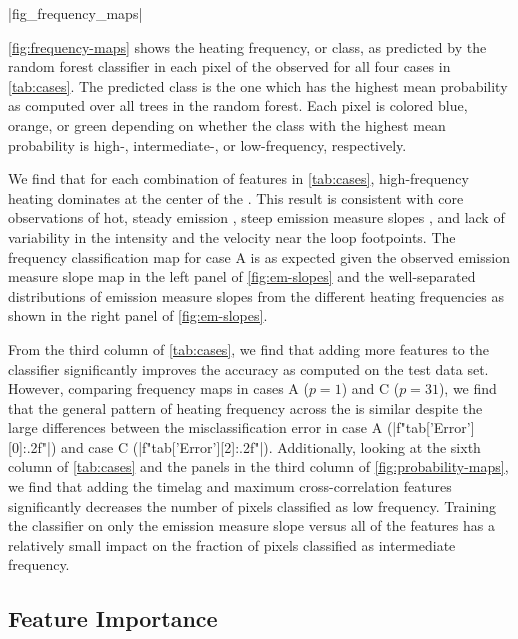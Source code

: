 \py[manager_ml]|fig_frequency_maps|

\autoref{fig:frequency-maps} shows the heating frequency, or class, as predicted by the random forest classifier in each pixel of the observed \AR{} for all four cases in \autoref{tab:cases}. The predicted class is the one which has the highest mean probability as computed over all trees in the random forest. Each pixel is colored blue, orange, or green depending on whether the class with the highest mean probability is high-, intermediate-, or low-frequency, respectively.

We find that for each combination of features in \autoref{tab:cases}, high-frequency heating dominates at the center of the \AR{}. This result is consistent with \AR{} core observations of hot, steady emission \citep{warren_evidence_2010,warren_constraints_2011}, steep emission measure slopes \citep[e.g.][]{winebarger_using_2011,del_zanna_evolution_2015}, and lack of variability in the intensity \citep[e.g.][]{antiochos_constraints_2003} and the velocity \citep{brooks_flows_2009} near the loop footpoints. The frequency classification map for case A is as expected given the observed emission measure slope map in the left panel of \autoref{fig:em-slopes} and the well-separated distributions of emission measure slopes from the different heating frequencies as shown in the right panel of \autoref{fig:em-slopes}.

From the third column of \autoref{tab:cases}, we find that adding more features to the classifier significantly improves the accuracy as computed on the test data set. However, comparing frequency maps in cases A ($p=1$) and C ($p=31$), we find that the general pattern of heating frequency across the \AR{} is similar despite the large differences between the misclassification error in case A (\py[manager_ml]|f"{tab['Error'][0]:.2f}"|) and case C (\py[manager_ml]|f"{tab['Error'][2]:.2f}"|). Additionally, looking at the sixth column of \autoref{tab:cases} and the panels in the third column of \autoref{fig:probability-maps}, we find that adding the timelag and maximum cross-correlation features significantly decreases the number of pixels classified as low frequency. Training the classifier on only the emission measure slope versus all of the features has a relatively small impact on the fraction of pixels classified as intermediate frequency.

\subsection{Feature Importance}\label{sec:feature-importance}

